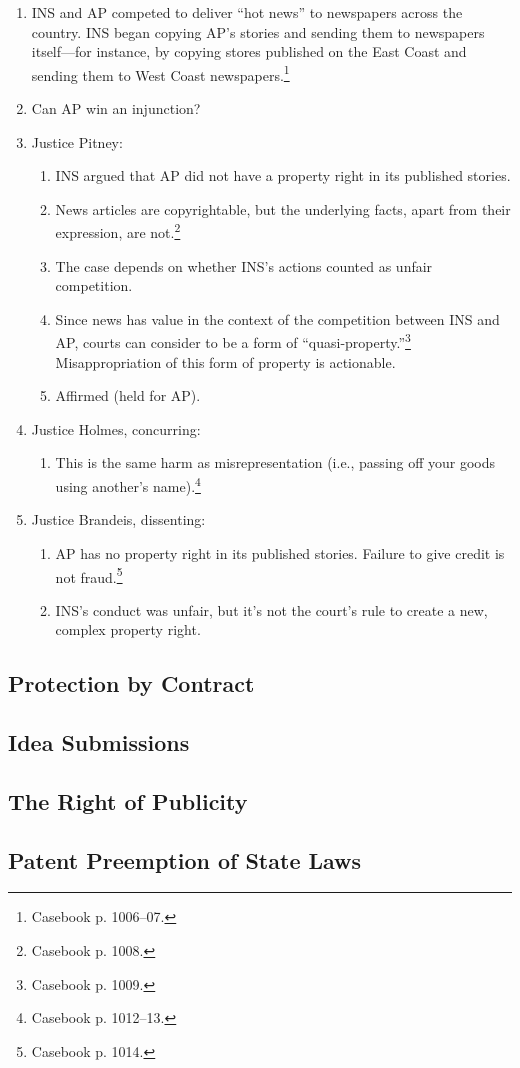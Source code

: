 \begin{enumerate}
    \item INS and AP competed to deliver ``hot news'' to newspapers across the 
    country. INS began copying AP's stories and sending them to newspapers 
    itself---for instance, by copying stores published on the East Coast and 
    sending them to West Coast newspapers.\footnote{Casebook p. 1006--07.}
    \item Can AP win an injunction?
    \item Justice Pitney:
    \begin{enumerate}
        \item INS argued that AP did not have a property right in its 
        published stories.
        \item News articles are copyrightable, but the underlying facts, apart 
        from their expression, are not.\footnote{Casebook p. 1008.}
        \item The case depends on whether INS's actions counted as unfair 
        competition.
        \item Since news has value in the context of the competition between 
        INS and AP, courts can consider to be a form of 
        ``quasi-property.''\footnote{Casebook p. 1009.} Misappropriation of 
        this form of property is actionable.
        \item Affirmed (held for AP).
    \end{enumerate}
    \item Justice Holmes, concurring:
    \begin{enumerate}
        \item This is the same harm as misrepresentation (i.e., passing off 
        your goods using another's name).\footnote{Casebook p. 1012--13.}
    \end{enumerate}
    \item Justice Brandeis, dissenting:
    \begin{enumerate}
        \item AP has no property right in its published stories. Failure to 
        give credit is not fraud.\footnote{Casebook p. 1014.}
        \item INS's conduct was unfair, but it's not the court's rule to 
        create a new, complex property right.
    \end{enumerate}
\end{enumerate}

\subsection{Protection by Contract}


\subsection{Idea Submissions}


\subsection{The Right of Publicity}


\subsection{Patent Preemption of State Laws}

